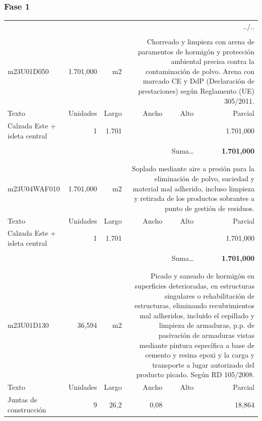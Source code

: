 \documentclass{book}%
\begin{document}
\subsubsection{Fase 1}%
\begin{longtable}{lrrrrr}%
\multicolumn{6}{r}{../..}\\%
\endfoot%
\endlastfoot%
&&&&&\\%
m23U01D050& 1.701,000& m2&\multicolumn{3}{p{6cm}}{\scriptsize Chorreado y limpieza con arena de paramentos de hormigón y protección ambiental precisa contra la contaminación de polvo. Arena con marcado CE y DdP (Declaración de prestaciones) según Reglamento (UE) 305/2011.\normalsize}\\%
Texto&Unidades&Largo&Ancho&Alto&Parcial\\%
\hline%
\multicolumn{1}{p{3.5cm}}{Calzada Este + isleta central}&1&1.701&&& 1.701,000\\%
&&&&&\\%
\multicolumn{5}{r}{Suma\ldots}&\textbf{ 1.701,000}\\%
\hline%
&&&&&\\%
&&&&&\\%
m23U04WAF010& 1.701,000& m2&\multicolumn{3}{p{6cm}}{\scriptsize Soplado mediante aire a presión para la eliminación de polvo, suciedad y material mal adherido, incluso limpieza y retirada de los productos sobrantes a punto de gestión de residuos.\normalsize}\\%
Texto&Unidades&Largo&Ancho&Alto&Parcial\\%
\hline%
\multicolumn{1}{p{3.5cm}}{Calzada Este + isleta central}&1&1.701&&& 1.701,000\\%
&&&&&\\%
\multicolumn{5}{r}{Suma\ldots}&\textbf{ 1.701,000}\\%
\hline%
&&&&&\\%
&&&&&\\%
m23U01D130&    36,594& m2&\multicolumn{3}{p{6cm}}{\scriptsize Picado y saneado de hormigón en superficies deterioradas, en estructuras singulares o rehabilitación de estructuras, eliminando recubrimientos mal adheridos, incluido el cepillado y limpieza de armaduras, p.p. de pasivación de armaduras vistas mediante pintura específica a base de cemento y resina epoxi y la carga y transporte a lugar autorizado del producto picado. Según RD 105/2008.\normalsize}\\%
Texto&Unidades&Largo&Ancho&Alto&Parcial\\%
\hline%
\multicolumn{1}{p{3.5cm}}{Juntas de construcción}&9&26,2&0,08&&    18,864\\%

\end{longtable}
\end{document}
